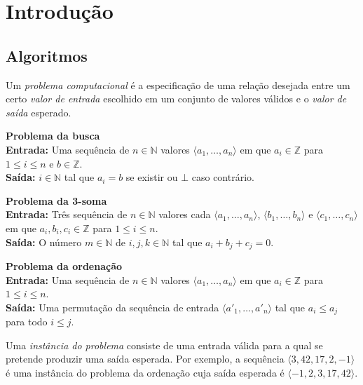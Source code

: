 \chapter{Introdução}

\section{Algoritmos}

Um {\em problema computacional} é a especificação de uma relação desejada entre um certo {\em valor de entrada} escolhido em um conjunto de valores válidos e o {\em valor de saída} esperado.

\begin{example}
  {\bf Problema da busca}\\

  {\bf Entrada:} Uma sequência de $n \in \mathbb{N}$ valores $\langle a_1, \dots, a_n \rangle$ em que $a_i \in \mathbb{Z}$ para $1 \leq i \leq n$ e $b \in \mathbb{Z}$.\\

  {\bf Saída:} $i \in \mathbb{N}$ tal que $a_i = b$ se existir ou $\bot$ caso contrário.
\end{example}

\begin{example}
  {\bf Problema da 3-soma}\\

  {\bf Entrada:} Três sequência de $n \in \mathbb{N}$ valores cada $\langle a_1, \dots, a_n \rangle$,  $\langle b_1, \dots, b_n \rangle$ e $\langle c_1, \dots, c_n \rangle$ em que $a_i, b_i, c_i \in \mathbb{Z}$ para $1 \leq i \leq n$.\\

  {\bf Saída:} O número $m \in \mathbb{N}$ de $i, j, k \in \mathbb{N}$ tal que $a_i + b_j + c_j = 0$.
\end{example}

\begin{example}
  {\bf Problema da ordenação}\\

  {\bf Entrada:} Uma sequência de $n \in \mathbb{N}$ valores $\langle a_1, \dots, a_n \rangle$ em que $a_i \in \mathbb{Z}$ para $1 \leq i \leq n$.\\

  {\bf Saída:} Uma permutação da sequência de entrada $\langle a'_1, \dots, a'_n \rangle$ tal que $a_i \leq a_j$ para todo $i \leq j$.
\end{example}

Uma {\em instância do problema} consiste de uma entrada válida para a qual se pretende produzir uma saída esperada.
Por exemplo, a sequência $\langle 3, 42, 17, 2, -1 \rangle$ é uma instância do problema da ordenação cuja saída esperada é $\langle -1, 2, 3, 17, 42 \rangle$.


